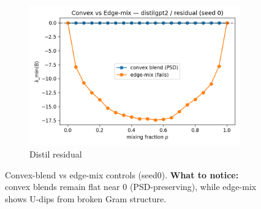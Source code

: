 \documentclass[11pt]{article}
\newcommand{\1}{\mathbf{1}}
\begin{document}
\begin{figure}[t]
\vspace{0.25em}

\begin{subfigure}[t]{0.48\textwidth}
\includegraphics[width=\linewidth]{figs/control_convex_vs_edge_mix_distilgpt2_residual_seed0.png}
\caption{Distil residual}
\end{subfigure}
\caption{Convex-blend vs edge-mix controls (seed0). \textbf{What to notice:} convex blends remain flat near 0 (PSD-preserving), while edge-mix shows U-dips from broken Gram structure.}
\label{fig:controls}
\end{figure}
\end{document}
